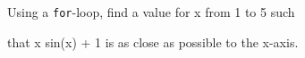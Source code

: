 Using a \texttt{for}-loop, find a value for x from 1 to 5 such

that x sin(x) + 1 is as close as possible to the x-axis.

